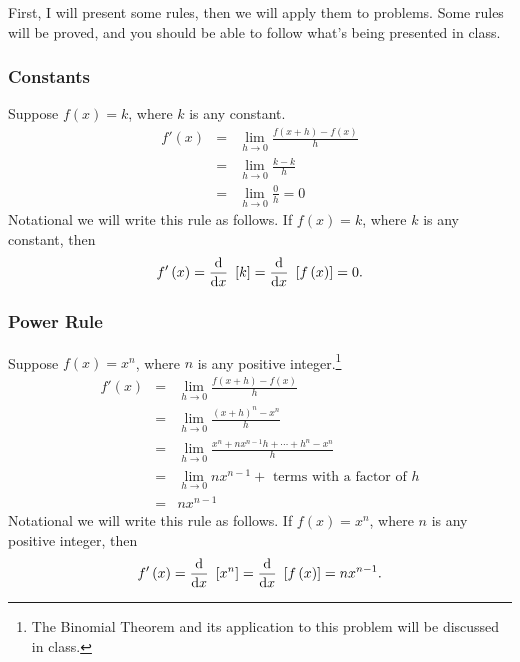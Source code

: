 \documentclass[12pt,addpoints, answers, fleqn]{exam}
\begin{document}
 
First, I will present some rules, then we will apply them to problems.
Some rules will be proved, and you should be able to follow what's being presented in class.



\subsubsection{Constants}
Suppose $f\left( x \right) = k$, where $k$ is any constant.
\begin{eqnarray*}
f' \left( x \right) &=& \mathop {\lim }\limits_{h \to 0 }  \frac{f \left( x+h \right) - f \left( x \right)}{h}\\
&=& \mathop {\lim }\limits_{h \to 0 }  \frac{k - k}{h}\\
&=& \mathop {\lim }\limits_{h \to 0 }  \frac{0}{h} = 0
\end{eqnarray*}
Notational we will write this rule as follows. If $f\left(x\right) = k$, where $k$ is any constant, then
\[
f' \left( x \right) = \frac{{\rm{d}}}{{\rm{d}}x} \ \left[ k \right]= \frac{{\rm{d}}}{{\rm{d}}x} \ \left[ f \left( x \right) \right]= 0.
\]



\subsubsection{Power Rule}
Suppose $f\left( x \right) = x^n$, where $n$ is any positive integer.\footnote{The Binomial Theorem and its application to this problem will be discussed in class.}
\begin{eqnarray*}
f' \left( x \right) &=& \mathop {\lim }\limits_{h \to 0 }  \frac{f \left( x+h \right) - f \left( x \right)}{h}\\
&=& \mathop {\lim }\limits_{h \to 0 }  \frac{ \left( x+h \right)^n - x^n}{h}\\
&=& \mathop {\lim }\limits_{h \to 0 }  \frac{x^n + nx^{n-1}h + \cdots + h^n - x^n}{h}\\
&=& \mathop {\lim }\limits_{h \to 0 }  nx^{n-1} + \mbox{ terms with a factor of $h$}\\
&=& nx^{n-1}
\end{eqnarray*}
Notational we will write this rule as follows. If $f\left(x\right) = x^n$, where $n$ is any positive integer, then
\[
f' \left( x \right) = \frac{{\rm{d}}}{{\rm{d}}x} \ \left[ x^n \right]= \frac{{\rm{d}}}{{\rm{d}}x} \ \left[ f \left( x \right) \right]= nx^{n-1}.
\]
\end{document}

